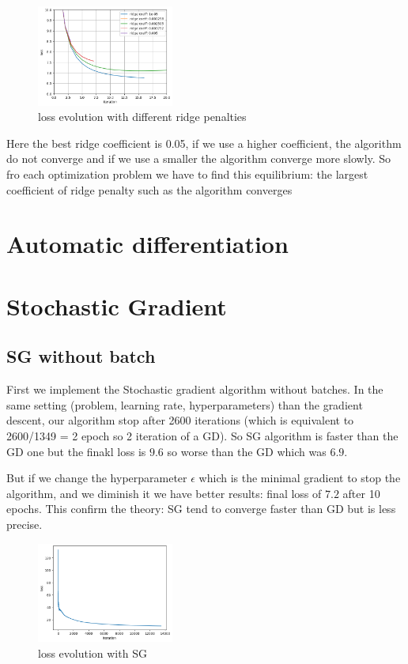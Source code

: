 \documentclass{article}
\begin{document}
     \begin{figure}[!h]
    \centering
    \includegraphics[width=0.4\textwidth]{images/loss3.png}
    \caption{loss evolution with different ridge penalties}
    \label{fig:loss3}
    \end{figure}   

    Here the best ridge coefficient is 0.05, if we use a higher coefficient, the algorithm do not converge and if we use a smaller the algorithm converge more slowly. So fro each optimization problem we have to find this equilibrium: the largest coefficient of ridge penalty such as the algorithm converges


    
\section{Automatic differentiation}

\section{Stochastic Gradient}
    \subsection{SG without batch}

    First we implement the Stochastic gradient algorithm without batches. In the same setting (problem, learning rate, hyperparameters) than the gradient descent, our algorithm stop after 2600 iterations (which is equivalent to 2600/1349 = 2 epoch so 2 iteration of a GD). So SG algorithm is faster than the GD one but the finakl loss is $9.6$ so worse than the GD which was $6.9$.
    
    But if we change the hyperparameter $\epsilon$ which is the minimal gradient to stop the algorithm, and we diminish it we have better results: final loss of $7.2$ after 10 epochs. This confirm the theory: SG tend to converge faster than GD but is less precise.
    \begin{figure}[!h]
    \centering
    \includegraphics[width=0.4\textwidth]{images/sg1.png}
    \caption{loss evolution with SG}
    \label{fig:sg1}
    \end{figure}      
\end{document}
